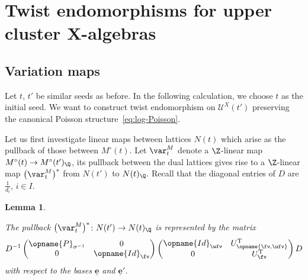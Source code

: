 \documentclass[pdftex]{sigma}
\newcommand{\Mc}{M^\circ}
\newcommand{\XClAlg}{\mathcal{U}^X}
\newcommand{\Id}{{\opname{Id}}}
\newcommand{\trans}{\opname{P}}
\newcommand{\ee}{\mathbf{e}}
\newcommand{\uee}{\underline{\ee}}
\newcommand{\low}{\opname{\fv,\ufv}}
\numberwithin{equation}{section}
\newtheorem{Lemma}[Theorem]{Lemma}
\begin{document}
\section[Twist endomorphisms for upper cluster X-algebras]{Twist endomorphisms for upper cluster $\boldsymbol{X}$-algebras}\label{sec:Twist-endomorphisms-X}

\subsection{Variation maps}\label{subsec:Variation-N-maps}

Let $t$, $t'$ be similar seeds as before. In the following calculation,
we choose $t$ as the initial seed. We want to construct twist endomorphism
on $\XClAlg(t')$ preserving the canonical Poisson structure~\eqref{eq:log-Poisson}.

Let us first investigate linear maps between lattices $N(t)$ which
arise as the pullback of those between $\Mc(t)$. Let $\var_{t}^{M}$
denote a $\Z$-linear map $\Mc(t)\rightarrow\Mc(t')_{\Q}$,
its pullback between the dual lattices gives rise to a $\Z$-linear
map $\bigl(\var_{t}^{M}\bigr)^{*}$ from $N(t')$ to $N(t)_{\Q}$. Recall that
the diagonal entries of $D$ are $\frac{1}{d_{i}}$, $i\in I$.

\begin{Lemma}\label{lem:pullback_matrix}

The pullback $\bigl(\var_{t}^{M}\bigr)^{*}\colon N(t')\rightarrow N(t)_{\Q}$ is represented
by the matrix \[D^{-1}\begin{pmatrix}
\trans_{\sigma^{-1}} & 0\\
0 & \Id_{\fv}
\end{pmatrix}\begin{pmatrix}
\Id_{\ufv} & U_{\low}^{\rm T}\\
0 & U_{\fv}^{\rm T}
\end{pmatrix}D\]
 with respect to the bases $\uee$ and $\uee'$.

\end{Lemma}
\end{document}
